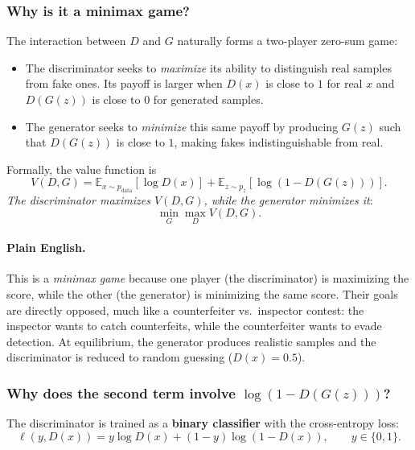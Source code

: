 \documentclass[11pt]{article}
\theoremstyle{remark}
\begin{document}
\subsubsection*{Why is it a minimax game?}

The interaction between $D$ and $G$ naturally forms a two-player zero-sum game:
\begin{itemize}
    \item The discriminator seeks to \emph{maximize} its ability to distinguish real samples from fake ones. Its payoff is larger when $D(x)$ is close to $1$ for real $x$ and $D(G(z))$ is close to $0$ for generated samples.
    \item The generator seeks to \emph{minimize} this same payoff by producing $G(z)$ such that $D(G(z))$ is close to $1$, making fakes indistinguishable from real.
\end{itemize}

Formally, the value function is
\begin{equation}
    V(D,G) = \mathbb{E}_{x\sim p_{\text{data}}}[\log D(x)]
           + \mathbb{E}_{z\sim p_z}[\log(1-D(G(z)))].
\end{equation}
\emph{The discriminator maximizes $V(D,G)$, while the generator minimizes it}:
\begin{equation}
    \min_G \max_D V(D,G).
\end{equation}

\paragraph{Plain English.}
This is a \emph{minimax game} because one player (the discriminator) is maximizing the score, while the other (the generator) is minimizing the same score. Their goals are directly opposed, much like a counterfeiter vs.\ inspector contest: the inspector wants to catch counterfeits, while the counterfeiter wants to evade detection. At equilibrium, the generator produces realistic samples and the discriminator is reduced to random guessing ($D(x)=0.5$).

\subsubsection*{Why does the second term involve $\log(1-D(G(z)))$?}

The discriminator is trained as a \textbf{binary classifier} with the cross-entropy loss:
\[
\ell(y,D(x)) = y\log D(x) + (1-y)\log(1-D(x)), \qquad y\in\{0,1\}.
\]
\end{document}
